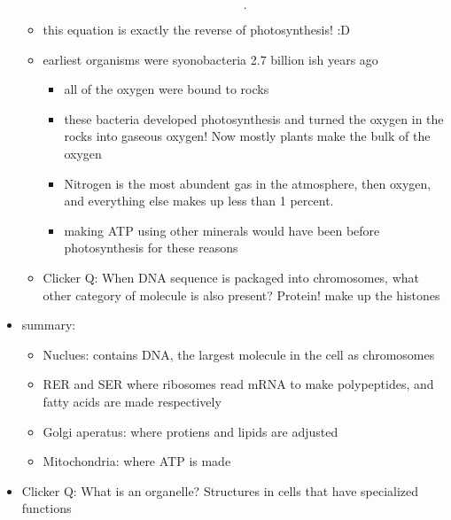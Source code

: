 \documentclass{article}
\theoremstyle{definition}
\begin{document}
\begin{itemize}
\begin{itemize}
\[				.\] 
			\item this equation is exactly the reverse of photosynthesis! :D
			\item earliest organisms were syonobacteria 2.7 billion ish years ago
				\begin{itemize}
					\item all of the oxygen were bound to rocks
					\item these bacteria developed photosynthesis and turned the oxygen in the rocks into gaseous oxygen! Now mostly plants make the bulk of the oxygen
					\item Nitrogen is the most abundent gas in the atmosphere, then oxygen, and everything else makes up less than 1 percent.
					\item making ATP using other minerals would have been before photosynthesis for these reasons
				\end{itemize}
			\item Clicker Q: When DNA sequence is packaged into chromosomes, what other category of molecule is also present? Protein! make up the histones
		\end{itemize}
	\item summary:
		\begin{itemize}
			\item Nuclues: contains DNA, the largest molecule in the cell as chromosomes
			\item RER and SER where ribosomes read mRNA to make polypeptides, and fatty acids are made respectively
			\item Golgi aperatus: where protiens and lipids are adjusted
			\item Mitochondria: where ATP is made
		\end{itemize}
	\item Clicker Q: What is an organelle? Structures in cells that have specialized functions
\end{itemize}
\end{document}

